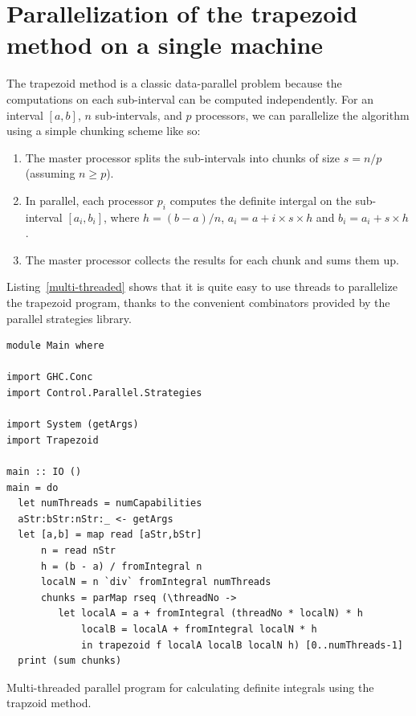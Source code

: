 \documentclass{tmr}
\begin{document}
\section{Parallelization of the trapezoid method on a single machine}

The trapezoid method is a classic data-parallel problem because
the computations on each sub-interval can be computed independently.
For an interval $[a,b]$, $n$ sub-intervals, and $p$ processors, we can parallelize
the algorithm using a simple chunking scheme like so:
\begin{enumerate}
   \item The master processor splits the sub-intervals into chunks of size $s = n/p$ (assuming $n \ge p$).
   \item In parallel, each processor $p_i$ computes the definite intergal on the sub-interval 
         $[a_i, b_i]$, where $h = (b - a)/n$, $a_i = a + i \times s \times h$ and
         $b_i = a_i + s \times h$.
   \item The master processor collects the results for each chunk and sums them up.
\end{enumerate}
Listing~\ref{multi-threaded} shows that it is quite easy to use threads to
parallelize the trapezoid program, thanks to the convenient combinators provided by the
parallel strategies library.

\begin{listing}
\begin{Verbatim}
module Main where

import GHC.Conc
import Control.Parallel.Strategies

import System (getArgs)
import Trapezoid

main :: IO ()
main = do
  let numThreads = numCapabilities
  aStr:bStr:nStr:_ <- getArgs
  let [a,b] = map read [aStr,bStr]
      n = read nStr
      h = (b - a) / fromIntegral n
      localN = n `div` fromIntegral numThreads
      chunks = parMap rseq (\threadNo ->
         let localA = a + fromIntegral (threadNo * localN) * h
             localB = localA + fromIntegral localN * h
             in trapezoid f localA localB localN h) [0..numThreads-1]
  print (sum chunks)
\end{Verbatim}
\caption{Multi-threaded parallel program for calculating definite integrals using the trapzoid method. \label{multi-threaded}}
\end{listing}

\end{document}
